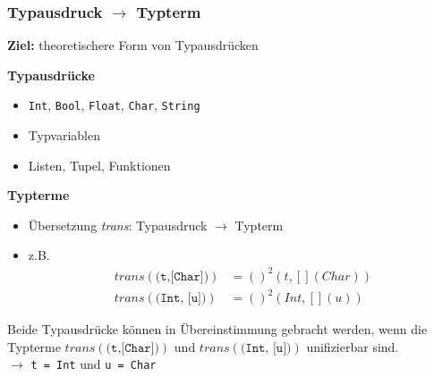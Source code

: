 \documentclass{beamer}
\begin{document}
\begin{frame}[fragile] \frametitle{Typausdruck $\to$ Typterm}
	\footnotesize
	
	\textbf{Ziel:} theoretischere Form von Typausdrücken
	
	\textbf{Typausdrücke}
	\begin{itemize}
		\item \texttt{Int}, \texttt{Bool}, \texttt{Float}, \texttt{Char}, \texttt{String}
		\item Typvariablen
		\item Listen, Tupel, Funktionen
	\end{itemize}

	\textbf{Typterme}
	\begin{itemize}
		\item Übersetzung \textit{trans}: Typausdruck $\to$ Typterm
		\pause
		\item z.B.
		\begin{equation*}
			\begin{aligned}
				trans(\texttt{(t,[Char])}) &= ()^2(t, [](Char)) \\
				trans(\texttt{(Int, [u])}) &= ()^2(Int, [](u))
			\end{aligned}
		\end{equation*}
	\end{itemize}

	\pause
	
	Beide Typausdrücke können in Übereinstimmung gebracht werden, wenn die Typterme $trans(\texttt{(t,[Char])})$ und $trans(\texttt{(Int, [u])})$ unifizierbar sind.
	\\ \pause
	$\to$ \texttt{t = Int} und \texttt{u = Char}
\end{frame}
\end{document}
